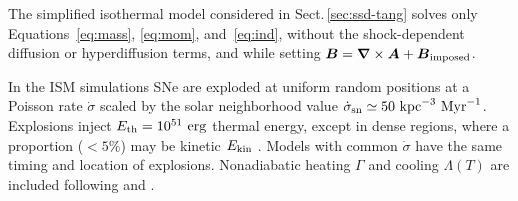 \documentclass[preprint2]{aastex63}
\newcommand\SNr{\dot\sigma_{\rm sn}}
\newcommand\ESK{E_{\rm kin}}
\newcommand\EST{E_{\rm th}}
\newcommand{\vect}[1]{{{\mbox{\boldmath $#1$}}}}%
\newcommand\kpc{~ {\rm kpc}}
\newcommand\Myr{~ {\rm Myr}}
\newcommand\erg{~ {\rm erg}}
\begin{document}
 The simplified isothermal model considered in
Sect.\,\ref{sec:ssd-tang} solves only Equations~\eqref{eq:mass},
 \eqref{eq:mom}, and~\eqref{eq:ind}, without the shock-dependent diffusion or
 hyperdiffusion terms, and while setting
 $\vect{B}=\vect\nabla\times\vect{A}+\vect{B}_{\rm imposed}$.

 {In the ISM simulations} SNe are exploded at {uniform} random positions
 at a Poisson rate $\dot\sigma$ {scaled by} the solar neighborhood
 value $\SNr\simeq 50\kpc^{-3}\Myr^{-1}$.
 Explosions inject $\EST = 10^{51}\erg$ thermal energy, except in
 dense regions, where a proportion ($<5\%$) may be kinetic $\ESK$ 
 \citep[see][]{GMKSH20}.
 {Models with common $\dot\sigma$ have the same timing and location of
 explosions.}
 Nonadiabatic heating $\Gamma$ and cooling $\Lambda (T)$ are included
 \citep{Gent:2013b} following \citet{Wolfire:1995} and \citet{Sarazin:1987}.
\end{document}

